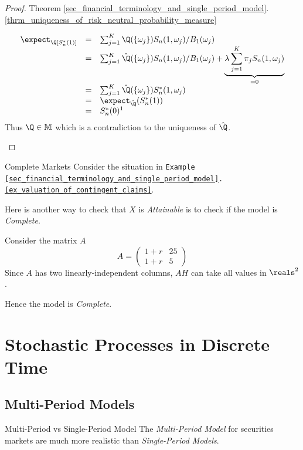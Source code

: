 \documentclass[11pt,a4paper]{article}
\begin{document}
\begin{proof}{Theorem \ref{sec_financial_terminology_and_single_period_model}.\ref{thrm_uniqueness_of_risk_neutral_probability_measure}}
\begin{itemize}
      \[\begin{array}{rcl}
        \expect_\Q[S_n^*(1)]&=&\sum_{j=1}^K\Q(\{\omega_j\})S_n(1,\omega_j)/B_1(\omega_j)\\
        &=&\sum_{j=1}^K\hat\Q(\{\omega_j\})S_n(1,\omega_j)/B_1(\omega_j)+\underbrace{\lambda\sum_{j=1}^K\pi_jS_n(1,\omega_j)}_{=0}\\
        &=&\sum_{j=1}^K\hat\Q(\{\omega_j\})S_n^*(1,\omega_j)\\
        &=&\expect_{\hat\Q}(S_n^*(1))\\
        &=&S_n^*(0)\footnotemark
      \end{array}\]
      Thus $\Q\in\mathbb{M}$ which is a contradiction to the uniqueness of $\hat\Q$.
    \end{itemize}
    \proved
  \end{proof}

  \begin{example}{Complete Markets}
    Consider the situation in \texttt{Example \ref{sec_financial_terminology_and_single_period_model}.\ref{ex_valuation_of_contingent_claims}}.
    \par Here is another way to check that $X$ is \textit{Attainable} is to check if the model is \textit{Complete}.
    \par Consider the matrix $A$
    \[ A=\begin{pmatrix}
      1+r&25\\
      1+r&5
    \end{pmatrix} \]
    Since $A$ has two linearly-independent columns, $AH$ can take all values in $\reals^2$.
    \par Hence the model is \textit{Complete}.
  \end{example}

\section{Stochastic Processes in Discrete Time} \label{sec_stochastic_processes_in_discrete_time}

\subsection{Multi-Period Models}

  \begin{remark}{Multi-Period vs Single-Period Model}
    The \textit{Multi-Period Model} for securities markets are much more realistic than \textit{Single-Period Models}.
  \end{remark}
\end{document}
